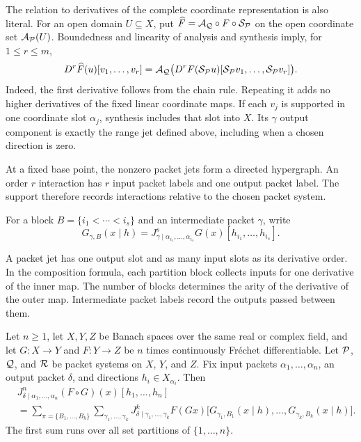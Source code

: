 The relation to derivatives of the complete coordinate representation is also literal. For an open domain $U\subseteq X$, put
$\widehat F=\mathcal A_{\mathcal Q}\circ F\circ\mathcal S_{\mathcal P}$ on the open coordinate set $\mathcal A_{\mathcal P}(U)$. Boundedness and linearity of analysis and synthesis imply, for $1\le r\le m$,
\[
D^r\widehat F(u)[v_1,\ldots,v_r]
=\mathcal A_{\mathcal Q}\bigl(D^rF(\mathcal S_{\mathcal P}u)
[\mathcal S_{\mathcal P}v_1,\ldots,\mathcal S_{\mathcal P}v_r]\bigr).
\]
Indeed, the first derivative follows from the chain rule. Repeating it adds no higher derivatives of the fixed linear coordinate maps. If each $v_j$ is supported in one coordinate slot $\alpha_j$, synthesis includes that slot into $X$. Its $\gamma$ output component is exactly the range jet defined above, including when a chosen direction is zero.

At a fixed base point, the nonzero packet jets form a directed hypergraph.  An order $r$ interaction has $r$ input packet labels and one output packet label.  The support therefore records interactions relative to the chosen packet system.

For a block $B=\{i_1<\cdots<i_s\}$ and an intermediate packet $\gamma$, write
\[
G_{\gamma,B}(x\mid h)
=
J^s_{\gamma\mid\alpha_{i_1},\ldots,\alpha_{i_s}}G(x)
[h_{i_1},\ldots,h_{i_s}].
\]

\begin{interpretation}[title={Arity of packet jets}]
A packet jet has one output slot and as many input slots as its derivative order. In the composition formula, each partition block collects inputs for one derivative of the inner map. The number of blocks determines the arity of the derivative of the outer map. Intermediate packet labels record the outputs passed between them.
\end{interpretation}

\begin{theorem}\label{thm:packet_faa}
Let $n\ge1$, let $X,Y,Z$ be Banach spaces over the same real or complex field, and let $G:X\to Y$ and $F:Y\to Z$ be $n$ times continuously Fr\'echet differentiable. Let $\mathcal P$, $\mathcal Q$, and $\mathcal R$ be packet systems on $X$, $Y$, and $Z$.  Fix input packets $\alpha_1,\ldots,\alpha_n$, an output packet $\delta$, and directions $h_i\in X_{\alpha_i}$.  Then
\[
\begin{aligned}
&J^{n}_{\delta\mid\alpha_1,\ldots,\alpha_n}(F\circ G)(x)
[h_1,\ldots,h_n]\\
&=
\sum_{\pi=\{B_1,\ldots,B_k\}}
\sum_{\gamma_1,\ldots,\gamma_k}
J^{k}_{\delta\mid\gamma_1,\ldots,\gamma_k}F(Gx)
\big[
G_{\gamma_1,B_1}(x\mid h),\ldots,
G_{\gamma_k,B_k}(x\mid h)
\big].
\end{aligned}
\]
The first sum runs over all set partitions of $\{1,\ldots,n\}$.
\end{theorem}

